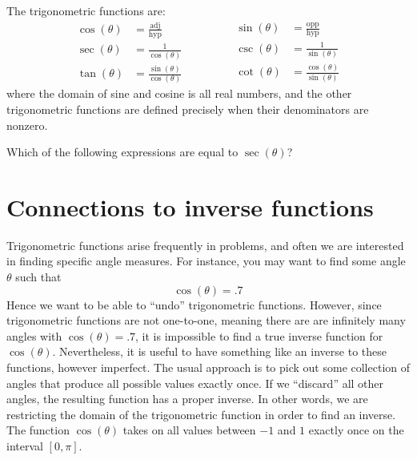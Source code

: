 \documentclass{ximera}
\begin{document}
\begin{definition}
  The trigonometric functions are:
  \[
  \begin{aligned}
  \cos(\theta) &= \frac{\text{adj}}{\text{hyp}}\\
  \sec(\theta) &= \frac{1}{\cos(\theta)}\\
  \tan(\theta) &= \frac{\sin(\theta)}{\cos(\theta)}\qquad
  \end{aligned}
  \qquad
  \begin{aligned}
  \sin(\theta) &= \frac{\text{opp}}{\text{hyp}}\\
  \csc(\theta) &= \frac{1}{\sin(\theta)}\\
  \cot(\theta) &= \frac{\cos(\theta)}{\sin(\theta)}    
  \end{aligned}
  \]
  where the domain of sine and cosine is all real numbers, and the
  other trigonometric functions are defined precisely when their
  denominators are nonzero.
\end{definition}

\begin{question}
  Which of the following expressions are equal to $\sec(\theta)$?
  \begin{selectAll}
    \choice[correct]{$\frac{\tan(\theta)}{\sin(\theta)}$}
  \end{selectAll}
\end{question}


  
\section{Connections to inverse functions}




Trigonometric functions arise frequently in problems, and often we are
interested in finding specific angle measures.  For instance, you may
want to find some angle $\theta$ such that
\[
\cos(\theta) = .7
\]
Hence we want to be able to ``undo'' trigonometric functions. However, since
trigonometric functions are not one-to-one, meaning there are are
infinitely many angles with $\cos(\theta) = .7$, it is impossible to
find a true inverse function for $\cos(\theta)$. Nevertheless, it is
useful to have something like an inverse to these functions, however
imperfect. The usual approach is to pick out some collection of angles
that produce all possible values exactly once. If we ``discard'' all
other angles, the resulting function has a proper inverse.  In other
words, we are restricting the domain of the trigonometric function in
order to find an inverse.  The function $\cos(\theta)$ takes on all
values between $-1$ and $1$ exactly once on the interval $[0,\pi]$.
\end{document}
